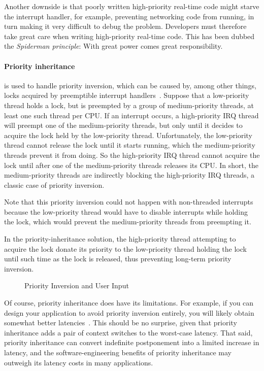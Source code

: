 Another downside is that poorly written high-priority real-time code
might starve the interrupt handler, for example, preventing networking
code from running, in turn making it very difficult to debug the problem.
Developers must therefore take great care when writing high-priority
real-time code.
This has been dubbed the \emph{Spiderman principle}: With great power
comes great responsibility.
\fi

\paragraph{Priority inheritance} is used to handle priority inversion,
which can be caused by, among other things, locks acquired by
preemptible interrupt handlers~\cite{LuiSha1990PriorityInheritance}.
Suppose that a low-priority thread holds a lock, but is preempted by
a group of medium-priority threads, at least one such thread per CPU.
If an interrupt occurs, a high-priority IRQ thread will preempt one
of the medium-priority threads, but only until it decides to acquire
the lock held by the low-priority thread.
Unfortunately, the low-priority thread cannot release the lock until
it starts running, which the medium-priority threads prevent it from
doing.
So the high-priority IRQ thread cannot acquire the lock until after one
of the medium-priority threads releases its CPU.
In short, the medium-priority threads are indirectly blocking the
high-priority IRQ threads, a classic case of priority inversion.

Note that this priority inversion could not happen with non-threaded
interrupts because the low-priority thread would have to disable interrupts
while holding the lock, which would prevent the medium-priority
threads from preempting it.

In the priority-inheritance solution, the high-priority thread attempting
to acquire the lock donate its priority to the low-priority thread holding
the lock until such time as the lock is released, thus preventing long-term
priority inversion.

\begin{figure}[tb]
\centering
{}
\caption{Priority Inversion and User Input}
\end{figure}

Of course, priority inheritance does have its limitations.
For example, if you can design your application to avoid priority
inversion entirely, you will likely obtain somewhat better
latencies~\cite{VictorYodaiken2004a}.
This should be no surprise, given that priority inheritance adds
a pair of context switches to the worst-case latency.
That said, priority inheritance can convert indefinite postponement
into a limited increase in latency, and the software-engineering
benefits of priority inheritance may outweigh its latency costs in
many applications.

